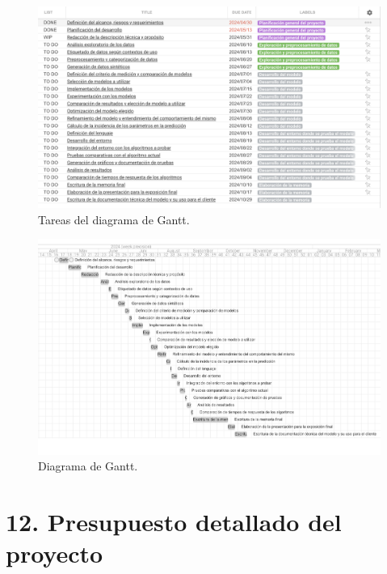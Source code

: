 \documentclass[
11pt, %
]{charter}
\begin{document}
	\begin{figure}[htpb]
		\centering 
		\includegraphics[height=.45\textheight]{./Figuras/gantt_tareas.png}
		\caption{Tareas del diagrama de Gantt.} %
		\label{fig:gantt_tareas}
	\end{figure}
	
\begin{landscape}
	\begin{figure}[htpb]
		\centering 
		\includegraphics[height=.85\textheight]{./Figuras/gantt_complete.png}
		\caption{Diagrama de Gantt.} %
		\label{fig:gantt_diagram}
	\end{figure}
\end{landscape}

\section{12. Presupuesto detallado del proyecto}
\label{sec:presupuesto}
\end{document}
